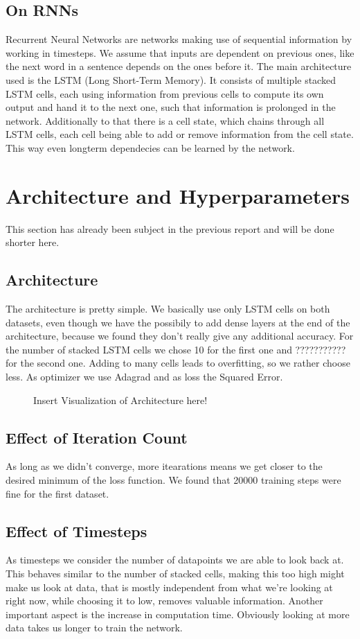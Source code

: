 \documentclass{article}
\begin{document}
\subsection{On RNNs}
Recurrent Neural Networks are networks making use of sequential information by working in timesteps. We assume that inputs are dependent on previous ones, like the next word in a sentence depends on the ones before it. The main architecture used is the LSTM (Long Short-Term Memory). It consists of multiple stacked LSTM cells, each using information from previous cells to compute its own output and hand it to the next one, such that information is prolonged in the network. Additionally to that there is a cell state, which chains through all LSTM cells, each cell being able to add or remove information from the cell state. This way even longterm dependecies can be learned by the network.

\section{Architecture and Hyperparameters}
This section has already been subject in the previous report and will be done shorter here.
\subsection{Architecture}
The architecture is pretty simple. We basically use only LSTM cells on both datasets, even though we have the possibily to add dense layers at the end of the architecture, because we found they don't really give any additional accuracy. For the number of stacked LSTM cells we chose 10 for the first one and ??????????? for the second one. Adding to many cells leads to overfitting, so we rather choose less. As optimizer we use Adagrad and as loss the Squared Error.
\begin{figure}[h]
Insert Visualization of Architecture here!
\end{figure}
\subsection{Effect of Iteration Count}
As long as we didn't converge, more itearations means we get closer to the desired minimum of the loss function. We found that 20000 training steps were fine for the first dataset.

\subsection{Effect of Timesteps}
As timesteps we consider the number of datapoints we are able to look back at. This behaves similar to the number of stacked cells, making this too high might make us look at data, that is mostly independent from what we're looking at right now, while choosing it to low, removes valuable information. Another important aspect is the increase in computation time. Obviously looking at more data takes us longer to train the network.
\newpage
\end{document}
